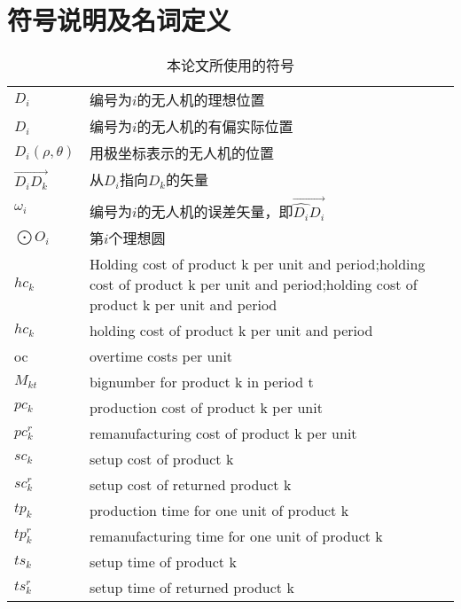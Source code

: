 \documentclass{cumcmthesis}
\begin{document}
	\section{符号说明及名词定义}
		\begin{center}
			\begin{table}[h]
				\caption{本论文所使用的符号}
				\begin{tabularx}{\textwidth}{p{0.08\textwidth}X}
					\toprule	
					
					$D_i$ & 编号为$i$的无人机的理想位置  \\
					$\widehat{D_i}$ & 编号为$i$的无人机的有偏实际位置  \\
					$D_i(\rho,\theta)$ & 用极坐标表示的无人机的位置 \\
					  
					$\overrightarrow{D_iD_k}$ & 从$D_i$指向$D_k$的矢量 \\
					$\omega_i$      & 编号为$i$的无人机的误差矢量，即$\overrightarrow{\widehat{D_i}D_i}$ \\
					$\bigodot O_i$    & 第$i$个理想圆  \\
					
					$hc_k$     & Holding cost of product k per unit and period;holding cost of product k per unit and period;holding cost of product k per unit and period   \\
					$hc_k$     & holding cost of product k per unit and period   \\
					oc   & overtime costs per unit   \\
					$M_{kt}$   & bignumber for product k in period t\\
					$pc_{k}$   & production cost of product k per unit\\
					$pc^r_{k}$ & remanufacturing cost of product k per unit\\
					$sc_{k}$   &  setup cost of product k\\
					$sc^r_{k}$ &  setup cost of returned product k\\
					$tp_{k}$   &  production time for one unit of product k\\
					$tp^r_{k}$ & remanufacturing time for one unit of product k\\
					$ts_{k}$   & setup time of product k\\
					$ts^r_{k}$ & setup time of returned product k\\
					

\end{tabularx}
\end{table}
\end{center}
\end{document}
